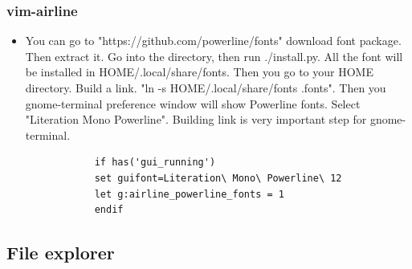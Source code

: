 \documentclass[paper=8.5in:11in, twoside, 12pt, pagesize=pdftex]{book}
\begin{document}
	\subsubsection{vim-airline} 
	\begin{itemize}
		
		\item You can go to "https://github.com/powerline/fonts" download font package. Then extract it. Go into the directory, then run ./install.py.  All the font will be installed in HOME/.local/share/fonts. Then you go to your HOME directory. Build a link. "ln -s HOME/.local/share/fonts .fonts". Then you gnome-terminal preference window will show Powerline fonts. Select "Literation Mono Powerline". Building link is very important step for gnome-terminal. 
		
		\begin{verbatim}
			if has('gui_running')
			set guifont=Literation\ Mono\ Powerline\ 12   
			let g:airline_powerline_fonts = 1
			endif
		\end{verbatim} 
	\end{itemize}
	
	\subsection{File explorer}
\end{document}
